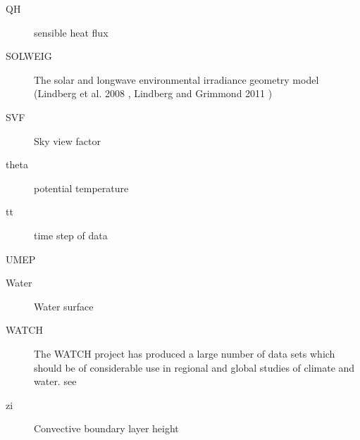 \documentclass[letterpaper,10pt,english]{sphinxmanual}
\begin{document}
\begin{description}
\item[{QH}] \leavevmode{}\label{\detokenize{notation:term-qh}}
sensible heat  flux

\item[{SOLWEIG}] \leavevmode{}\label{\detokenize{notation:term-solweig}}
The solar and longwave environmental irradiance geometry model
(Lindberg et al. 2008 \label{\detokenize{notation:id8}}{\hyperref[\detokenize{references:fl2008}]{\sphinxcrossref{{[}FL2008{]}}}},   Lindberg and Grimmond 2011 \label{\detokenize{notation:id9}}{\hyperref[\detokenize{references:fl2011}]{\sphinxcrossref{{[}FL2011{]}}}})

\item[{SVF}] \leavevmode{}\label{\detokenize{notation:term-svf}}
Sky view factor

\item[{theta}] \leavevmode{}\label{\detokenize{notation:term-theta}}
potential  temperature

\item[{tt}] \leavevmode{}\label{\detokenize{notation:term-tt}}
time step of data

\item[{UMEP}] \leavevmode{}\label{\detokenize{notation:term-umep}}

\item[{Water}] \leavevmode{}\label{\detokenize{notation:term-water}}
Water surface

\item[{WATCH}] \leavevmode{}\label{\detokenize{notation:term-watch}}
The WATCH project has produced a large number of data sets which should be of considerable use in regional and global studies of climate and water. see 

\item[{zi}] \leavevmode{}\label{\detokenize{notation:term-zi}}
Convective boundary layer height

\end{description}
\end{document}
